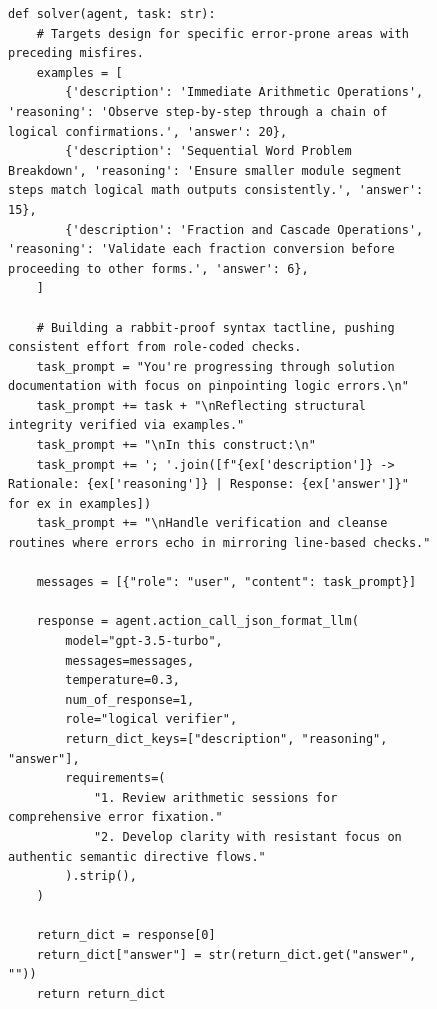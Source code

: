 \documentclass[11pt]{article}
\newcommand{\framework}{Gödel Agent\xspace}
\begin{document}
\newpage
\begin{figure}[ht]
\begin{lstlisting}[style=pythonstyle, caption={Policy at 20th Iteration found by \framework for MGSM.}]
def solver(agent, task: str):
    # Targets design for specific error-prone areas with preceding misfires.
    examples = [
        {'description': 'Immediate Arithmetic Operations', 'reasoning': 'Observe step-by-step through a chain of logical confirmations.', 'answer': 20},
        {'description': 'Sequential Word Problem Breakdown', 'reasoning': 'Ensure smaller module segment steps match logical math outputs consistently.', 'answer': 15},
        {'description': 'Fraction and Cascade Operations', 'reasoning': 'Validate each fraction conversion before proceeding to other forms.', 'answer': 6},
    ]

    # Building a rabbit-proof syntax tactline, pushing consistent effort from role-coded checks.
    task_prompt = "You're progressing through solution documentation with focus on pinpointing logic errors.\n"
    task_prompt += task + "\nReflecting structural integrity verified via examples."
    task_prompt += "\nIn this construct:\n"
    task_prompt += '; '.join([f"{ex['description']} -> Rationale: {ex['reasoning']} | Response: {ex['answer']}" for ex in examples])
    task_prompt += "\nHandle verification and cleanse routines where errors echo in mirroring line-based checks."

    messages = [{"role": "user", "content": task_prompt}]

    response = agent.action_call_json_format_llm(
        model="gpt-3.5-turbo", 
        messages=messages, 
        temperature=0.3, 
        num_of_response=1,
        role="logical verifier", 
        return_dict_keys=["description", "reasoning", "answer"], 
        requirements=(
            "1. Review arithmetic sessions for comprehensive error fixation." 
            "2. Develop clarity with resistant focus on authentic semantic directive flows."
        ).strip(),
    )
    
    return_dict = response[0]
    return_dict["answer"] = str(return_dict.get("answer", ""))
    return return_dict
\end{lstlisting}
\end{figure}
\end{document}
